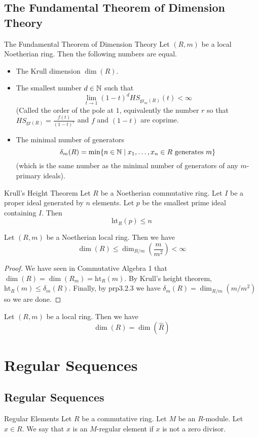 \documentclass[a4paper]{article}
\begin{document}
\subsection{The Fundamental Theorem of Dimension Theory}
\begin{thm}{The Fundamental Theorem of Dimension Theory}{} Let $(R,m)$ be a local Noetherian ring. Then the following numbers are equal. 
\begin{itemize}
\item The Krull dimension $\dim(R)$. 
\item The smallest number $d\in\mathbb{N}$ such that $$\lim_{t\to 1}(1-t)^dHS_{\text{gr}_m(R)}(t)<\infty$$ (Called the order of the pole at $1$, equivalently the number $r$ so that $HS_{\text{gr}(R)}=\frac{f(t)}{(1-t)^r}$ and $f$ and $(1-t)$ are coprime. 
\item The minimal number of generators $$\delta_m(R)=\min\{n\in\mathbb{N}\;|\;x_1,\dots,x_n\in R\text{ generates }m\}$$ (which is the same number as the minimal number of generators of any $m$-primary ideals). 
\end{itemize}
\end{thm}

\begin{thm}{Krull's Height Theorem}{} Let $R$ be a Noetherian commutative ring. Let $I$ be a proper ideal generated by $n$ elements. Let $p$ be the smallest prime ideal containing $I$. Then $$\text{ht}_R(p)\leq n$$
\end{thm}

\begin{prp}{}{} Let $(R,m)$ be a Noetherian local ring. Then we have $$\dim(R)\leq\dim_{R/m}\left(\frac{m}{m^2}\right)<\infty$$ \tcbline
\begin{proof}
We have seen in Commutative Algebra 1 that $\dim(R)=\dim(R_m)=\text{ht}_R(m)$. By Krull's height theorem, $\text{ht}_R(m)\leq\delta_m(R)$. Finally, by prp3.2.3 we have $\delta_m(R)=\dim_{R/m}(m/m^2)$ so we are done. 
\end{proof}
\end{prp}

\begin{prp}{}{} Let $(R,m)$ be a local ring. Then we have $$\dim(R)=\dim(\widehat{R})$$
\end{prp}

\pagebreak
\section{Regular Sequences}
\subsection{Regular Sequences}
\begin{defn}{Regular Elements}{} Let $R$ be a commutative ring. Let $M$ be an $R$-module. Let $x\in R$. We say that $x$ is an $M$-regular element if $x$ is not a zero divisor. 
\end{defn}
\end{document}
